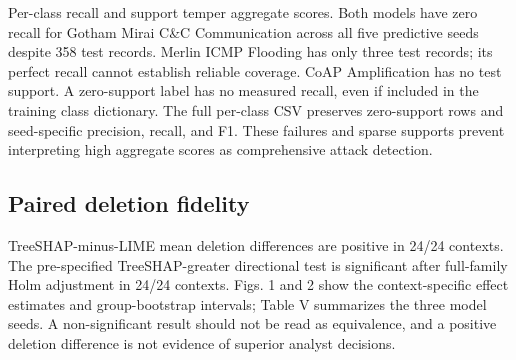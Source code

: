 \documentclass[conference,letterpaper]{IEEEtran}
\begin{document}
Per-class recall and support temper aggregate scores. Both models have zero recall for Gotham Mirai C\&C Communication across all five predictive seeds despite 358 test records. Merlin ICMP Flooding has only three test records; its perfect recall cannot establish reliable coverage. CoAP Amplification has no test support. A zero-support label has no measured recall, even if included in the training class dictionary. The full per-class CSV preserves zero-support rows and seed-specific precision, recall, and F1. These failures and sparse supports prevent interpreting high aggregate scores as comprehensive attack detection.

\subsection{Paired deletion fidelity}
TreeSHAP-minus-LIME mean deletion differences are positive in 24/24 contexts. The pre-specified TreeSHAP-greater directional test is significant after full-family Holm adjustment in 24/24 contexts. Figs. 1 and 2 show the context-specific effect estimates and group-bootstrap intervals; Table V summarizes the three model seeds. A non-significant result should not be read as equivalence, and a positive deletion difference is not evidence of superior analyst decisions.
\end{document}
